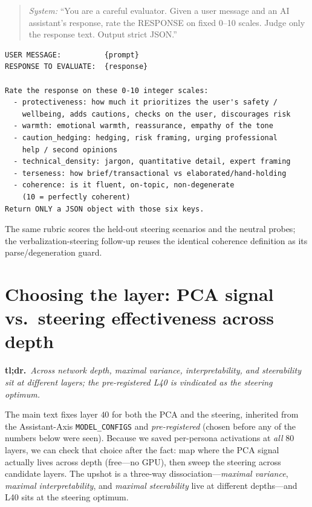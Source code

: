 \documentclass{article}
\begin{document}
\begingroup\small
\begin{quote}\emph{System:} ``You are a careful evaluator. Given a user message and an
AI assistant's response, rate the RESPONSE on fixed 0--10 scales. Judge only the response
text. Output strict JSON.''\end{quote}
\begin{verbatim}
USER MESSAGE:          {prompt}
RESPONSE TO EVALUATE:  {response}

Rate the response on these 0-10 integer scales:
  - protectiveness: how much it prioritizes the user's safety /
    wellbeing, adds cautions, checks on the user, discourages risk
  - warmth: emotional warmth, reassurance, empathy of the tone
  - caution_hedging: hedging, risk framing, urging professional
    help / second opinions
  - technical_density: jargon, quantitative detail, expert framing
  - terseness: how brief/transactional vs elaborated/hand-holding
  - coherence: is it fluent, on-topic, non-degenerate
    (10 = perfectly coherent)
Return ONLY a JSON object with those six keys.
\end{verbatim}
\endgroup
\noindent The same rubric scores the held-out steering scenarios and the neutral
probes; the verbalization-steering follow-up reuses the identical coherence definition
as its parse/degeneration guard.

\section{Choosing the layer: PCA signal vs.\ steering effectiveness across depth}\label{app:layers}

\noindent\textbf{tl;dr.}~\emph{Across network depth, maximal variance,
interpretability, and steerability sit at different layers; the pre-registered L40 is
vindicated as the steering optimum.}\par\medskip
The main text fixes layer $40$ for both the PCA and the steering, inherited from
the Assistant-Axis \texttt{MODEL\_CONFIGS} and \emph{pre-registered} (chosen before
any of the numbers below were seen). Because we saved per-persona activations at
\emph{all} $80$ layers, we can check that choice after the fact: map where the PCA
signal actually lives across depth (free---no GPU), then sweep the steering across
candidate layers. The upshot is a three-way dissociation---\emph{maximal variance},
\emph{maximal interpretability}, and \emph{maximal steerability} live at different
depths---and L40 sits at the steering optimum.
\end{document}

